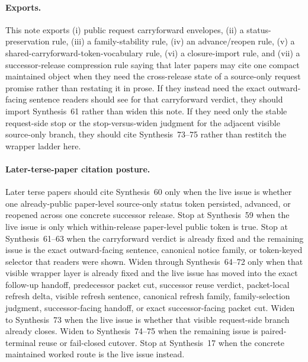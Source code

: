 \documentclass[11pt]{article}
\begin{document}
\paragraph{Exports.}
This note exports (i) public request carryforward envelopes, (ii) a status-preservation rule, (iii) a family-stability rule, (iv) an advance/reopen rule, (v) a shared-carryforward-token-vocabulary rule, (vi) a closure-import rule, and (vii) a successor-release compression rule saying that later papers may cite one compact maintained object when they need the cross-release state of a source-only request promise rather than restating it in prose. If they instead need the exact outward-facing sentence readers should see for that carryforward verdict, they should import Synthesis~61 rather than widen this note. If they need only the stable request-side stop or the stop-versus-widen judgment for the adjacent visible source-only branch, they should cite Synthesis~73--75 rather than restitch the wrapper ladder here.

\paragraph{Later-terse-paper citation posture.}
Later terse papers should cite Synthesis~60 only when the live issue is whether one already-public paper-level source-only status token persisted, advanced, or reopened across one concrete successor release. Stop at Synthesis~59 when the live issue is only which within-release paper-level public token is true. Stop at Synthesis~61--63 when the carryforward verdict is already fixed and the remaining issue is the exact outward-facing sentence, canonical notice family, or token-keyed selector that readers were shown. Widen through Synthesis~64--72 only when that visible wrapper layer is already fixed and the live issue has moved into the exact follow-up handoff, predecessor packet cut, successor reuse verdict, packet-local refresh delta, visible refresh sentence, canonical refresh family, family-selection judgment, successor-facing handoff, or exact successor-facing packet cut. Widen to Synthesis~73 when the live issue is whether that visible request-side branch already closes. Widen to Synthesis~74--75 when the remaining issue is paired-terminal reuse or fail-closed cutover. Stop at Synthesis~17 when the concrete maintained worked route is the live issue instead.\cite{series:publicrequeststatusenvelopes,series:publicrequestnotices,series:publicrequestnoticenormalforms,series:publicrequestnoticeselections,series:publicrequestresponsemenus,series:publicrequestresponsepackets,series:publicrequestresponsepacketcarryforward,series:publicrequestresponsepacketdeltaledgers,series:publicrequestresponsepacketrefreshnotices,series:publicrequestresponsepacketrefreshnoticenormalforms,series:publicrequestresponsepacketrefreshnoticeselections,series:publicrequestresponsepacketrefreshresponsemenus,series:publicrequestresponsepacketrefreshresponsepackets,series:publicrequestresponsepacketrefreshresponsepacketclosureverdicts,series:pairedterminalcitationdiscipline,series:pairedterminalcutoverrule,series:workedexample}
\end{document}
